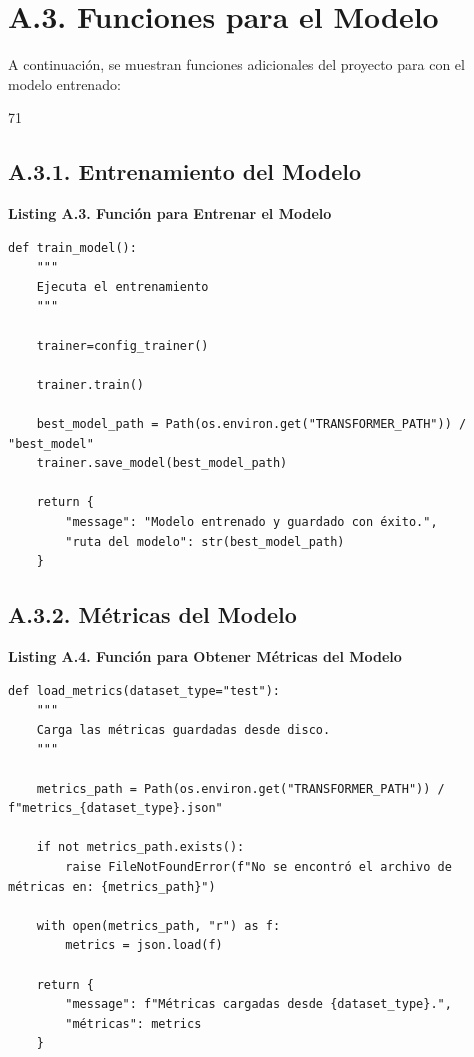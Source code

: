 \section*{A.3. Funciones para el Modelo}

A continuación, se muestran funciones adicionales del proyecto para con el modelo entrenado:

\begin{center}
71
\end{center}

\newpage


\subsection*{A.3.1. Entrenamiento del Modelo}

\begin{center}
\textbf{Listing A.3. Función para Entrenar el Modelo}
\end{center}

\begin{lstlisting}[style=pythoncode]
def train_model():
    """
    Ejecuta el entrenamiento
    """

    trainer=config_trainer()

    trainer.train()

    best_model_path = Path(os.environ.get("TRANSFORMER_PATH")) / "best_model"
    trainer.save_model(best_model_path)

    return {
        "message": "Modelo entrenado y guardado con éxito.",
        "ruta del modelo": str(best_model_path)
    }
\end{lstlisting}

\subsection*{A.3.2. Métricas del Modelo}

\begin{center}
\textbf{Listing A.4. Función para Obtener Métricas del Modelo}
\end{center}

\begin{lstlisting}[style=pythoncode]
def load_metrics(dataset_type="test"):
    """
    Carga las métricas guardadas desde disco.
    """

    metrics_path = Path(os.environ.get("TRANSFORMER_PATH")) / f"metrics_{dataset_type}.json"

    if not metrics_path.exists():
        raise FileNotFoundError(f"No se encontró el archivo de métricas en: {metrics_path}")

    with open(metrics_path, "r") as f:
        metrics = json.load(f)

    return {
        "message": f"Métricas cargadas desde {dataset_type}.",
        "métricas": metrics
    }
\end{lstlisting}

